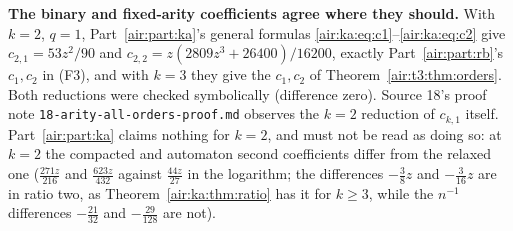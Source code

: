 \documentclass[11pt,letterpaper]{article}
\numberwithin{equation}{section}
\theoremstyle{remark}
\newcommand{\repopath}[1]{\nolinkurl{#1}}
\begin{document}
\textbf{The binary and fixed-arity coefficients agree where they should.} With $k=2$, $q=1$, Part~\ref{air:part:ka}'s general formulas \eqref{air:ka:eq:c1}--\eqref{air:ka:eq:c2} give $c_{2,1}=53z^2/90$ and $c_{2,2}=z(2809z^3+26400)/16200$, exactly Part~\ref{air:part:rb}'s $c_1,c_2$ in (F3), and with $k=3$ they give the $c_1,c_2$ of Theorem~\ref{air:t3:thm:orders}. Both reductions were checked symbolically (difference zero). Source 18's proof note \repopath{18-arity-all-orders-proof.md} observes the $k=2$ reduction of $c_{k,1}$ itself. Part~\ref{air:part:ka} claims nothing for $k=2$, and must not be read as doing so: at $k=2$ the compacted and automaton second coefficients differ from the relaxed one ($\frac{271z}{216}$ and $\frac{623z}{432}$ against $\frac{44z}{27}$ in the logarithm; the differences $-\frac38z$ and $-\frac3{16}z$ are in ratio two, as Theorem~\ref{air:ka:thm:ratio} has it for $k\ge3$, while the $n^{-1}$ differences $-\frac{21}{32}$ and $-\frac{29}{128}$ are not).
\end{document}

